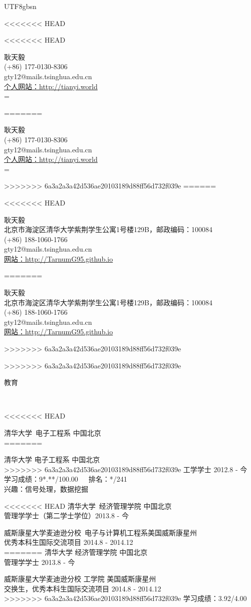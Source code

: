 \documentclass[9pt]{article}
\newenvironment{changemargin}[2]{%
  \begin{list}{}{%
    \setlength{\topsep}{0pt}%
    \setlength{\leftmargin}{#1}%
    \setlength{\rightmargin}{#2}%
    \setlength{\listparindent}{\parindent}%
    \setlength{\itemindent}{\parindent}%
    \setlength{\parsep}{\parskip}%
  }%
  \item[]}{\end{list}
}
\newcommand{\lineover}{
    \begin{changemargin}{-0.05in}{-0.05in}
        \vspace*{-8pt}
        \hrulefill \\
        \vspace*{-2pt}
    \end{changemargin}
}
\newcommand{\header}[1]{
    \begin{changemargin}{-0.5in}{-0.5in}
        \scshape{#1}\\
    \lineover
    \end{changemargin}
}
\newcommand{\contact}[5]{
<<<<<<< HEAD
    \begin{changemargin}{-0.5in}{-0.5in}
        \begin{center}
            {\Large \scshape {#1}}\\ \smallskip
            {#2}\\ \smallskip 
            {#3}\\ \smallskip
            {#4}\\ \smallskip
            {#5}\smallskip
        \end{center}
    \end{changemargin}
=======
	\begin{changemargin}{-0.5in}{-0.5in}
		\begin{center}
			{\Large \scshape {#1}}\\ \smallskip
			{#2}\\ \smallskip 
			{#3}\\ \smallskip
			{#4}\\ \smallskip
			{#5}\smallskip
		\end{center}
	\end{changemargin}
>>>>>>> 6a3a2a3a42d536ae20103189d88ff56d732f039e
}
\newenvironment{body} {
    \vspace*{-16pt}
    \begin{changemargin}{-0.25in}{-0.5in}
  } 
    {\end{changemargin}
}
\begin{document}
\begin{CJK*}{UTF8}{gbsn}

<<<<<<< HEAD
\contact{耿天毅}{(+86) 177-0130-8306}{gty12@mails.tsinghua.edu.cn}{\href{http://tianyi.world}{个人网站：http://tianyi.world}}
=======
\contact{耿天毅}{北京市海淀区清华大学紫荆学生公寓1号楼129B，邮政编码：100084}{(+86) 188-1060-1766}{gty12@mails.tsinghua.edu.cn}{\href{http://TarnumG95.github.io}{网站：http://TarnumG95.github.io}}
>>>>>>> 6a3a2a3a42d536ae20103189d88ff56d732f039e

\header{教育}

\begin{body}
<<<<<<< HEAD
    \vspace{14pt}

    清华大学\ 电子工程系 \hfill 中国北京 \\
=======
	\vspace{14pt}

	清华大学 电子工程系 \hfill 中国北京 \\
>>>>>>> 6a3a2a3a42d536ae20103189d88ff56d732f039e
工学学士 \hfill 2012.8 - 今 \\
学习成绩：9*.**/100.00\ \ \ 排名：*/241\\
兴趣：信号处理，数据挖掘 \\
\vspace{6pt}

<<<<<<< HEAD
    清华大学\ 经济管理学院 \hfill 中国北京 \\
管理学学士（第二学士学位）\hfill 2013.8 - 今 \\
\vspace{6pt}

    威斯康星大学麦迪逊分校\ 电子与计算机工程系\hfill 美国威斯康星州 \\
优秀本科生国际交流项目 \hfill 2014.8 - 2014.12 \\
=======
	清华大学 经济管理学院 \hfill 中国北京 \\
管理学学士 \hfill 2013.8 - 今 \\
\vspace{6pt}

	威斯康星大学麦迪逊分校 工学院 \hfill 美国威斯康星州 \\
交换生，优秀本科生国际交流项目 \hfill 2014.8 - 2014.12 \\
>>>>>>> 6a3a2a3a42d536ae20103189d88ff56d732f039e
学习成绩：3.92/4.00


\end{body}
\end{CJK*}
\end{document}
